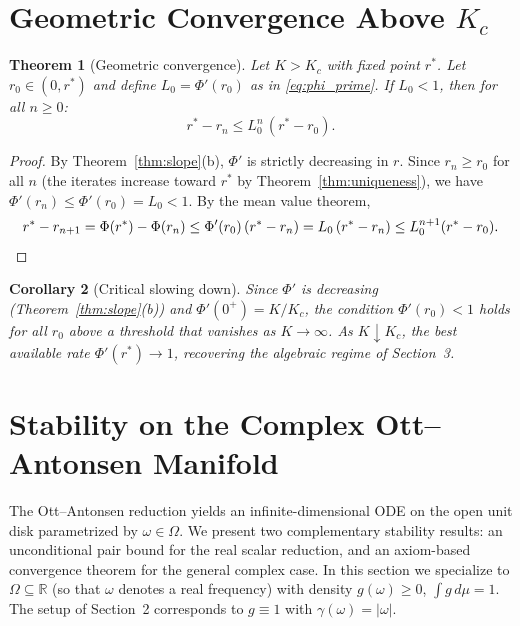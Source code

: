 \documentclass[12pt]{article}
\newtheorem{theorem}{Theorem}[section]
\newtheorem{corollary}[theorem]{Corollary}
\theoremstyle{definition}
\begin{document}
\section{Geometric Convergence Above $K_c$}

\begin{theorem}[Geometric convergence]\label{thm:geometric}
Let $K > K_c$ with fixed point $r^*$.  Let $r_0 \in (0, r^*)$ and define
$L_0 = \Phi'(r_0)$ as in \eqref{eq:phi_prime}.
If $L_0 < 1$, then for all $n \ge 0$:
\begin{equation}
r^* - r_n \le L_0^n\,(r^* - r_0).
\end{equation}
\end{theorem}

\begin{proof}
By Theorem~\ref{thm:slope}(b), $\Phi'$ is strictly decreasing in $r$.
Since $r_n \ge r_0$ for all $n$ (the iterates increase toward $r^*$ by
Theorem~\ref{thm:uniqueness}), we have $\Phi'(r_n) \le \Phi'(r_0) = L_0 < 1$.
By the mean value theorem,
\[
r^* - r_{n+1} = \Phi(r^*) - \Phi(r_n) \le \Phi'(r_0)\,(r^* - r_n)
= L_0\,(r^* - r_n) \le L_0^{n+1}(r^* - r_0). \qedhere
\]
\end{proof}

\begin{corollary}[Critical slowing down]\label{cor:slowing}
Since $\Phi'$ is decreasing (Theorem~\ref{thm:slope}(b)) and
$\Phi'(0^+) = K/K_c$, the condition $\Phi'(r_0) < 1$ holds
for all $r_0$ above a threshold that vanishes as $K \to \infty$.
As $K \downarrow K_c$, the best available rate $\Phi'(r^*) \to 1$,
recovering the algebraic regime of Section~3.
\end{corollary}


\section{Stability on the Complex Ott--Antonsen Manifold}

The Ott--Antonsen reduction \cite{ott2008} yields an infinite-dimensional
ODE on the open unit disk parametrized by $\omega \in \Omega$.
We present two complementary stability results: an unconditional
pair bound for the real scalar reduction, and an axiom-based
convergence theorem for the general complex case.
In this section we specialize to $\Omega \subseteq \mathbb{R}$
(so that $\omega$ denotes a real frequency) with density
$g(\omega) \ge 0$, $\int g\,d\mu = 1$.
The setup of Section~2 corresponds to $g \equiv 1$ with
$\gamma(\omega) = |\omega|$.
\end{document}
